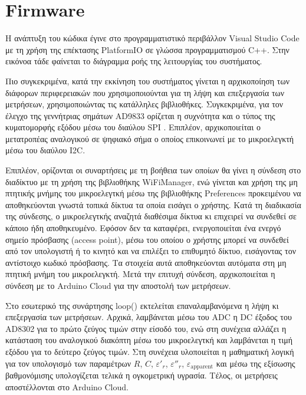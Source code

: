 \section{Firmware}
Η ανάπτυξη του κώδικα έγινε στο προγραμματιστικό περιβάλλον Visual Studio Code με τη χρήση της επέκτασης PlatformIO σε γλώσσα προγραμματισμού C++. Στην εικόνοα τάδε φαίνεται το διάγραμμα ροής της λειτουργίας του συστήματος.

\par Πιο συγκεκριμένα, κατά την εκκίνηση του συστήματος γίνεται η αρχικοποίηση των διάφορων περιφερειακών που χρησιμοποιούνται για τη λήψη και επεξεργασία των μετρήσεων, χρησιμοποιώντας τις κατάλληλες βιβλιοθήκες. Συγκεκριμένα, για τον έλεγχο της γεννήτριας σημάτων AD9833 ορίζεται η συχνότητα και ο τύπος της κυματομορφής εξόδου μέσω του διαύλου SPI . Επιπλέον, αρχικοποιείται ο μετατροπέας αναλογικού σε ψηφιακό σήμα ο οποίος επικοινωνεί με το μικροελεγκτή μέσω του διαύλου I2C.

\par Επιπλέον, ορίζονται οι συναρτήσεις με τη βοήθεια των οποίων θα γίνει η σύνδεση στο διαδίκτυο με τη χρήση της βιβλιοθήκης WiFiManager, ενώ γίνεται και χρήση της μη πτητικής μνήμης του μικροελεγτκή μέσω της βιβλιοθήκης Preferences προκειμένου να αποθηκεύονται γνωστά τοπικά δίκτυα τα οποία εισάγει ο χρήστης. Κατά τη διαδικασία της σύνδεσης, ο μικροελεγτκής αναζητά διαθέσιμα δίκτυα κι επιχειρεί να συνδεθεί σε κάποιο ήδη αποθηκευμένο. Εφόσον δεν τα καταφέρει, ενεργοποιείται ένα ενεργό σημείο πρόσβασης (access point), μέσω του οποίου ο χρήστης μπορεί να συνδεθεί από τον υπολογιστή ή το κινητό και να επιλέξει το επιθυμητό δίκτυο, εισάγοντας τον αντίστοιχο κωδικό πρόσβασης. Τα στοιχεία αυτά αποθηκεύονται αυτόματα στη μη πτητική μνήμη του μικροελεγκτή. Μετά την επιτυχή σύνδεση, αρχικοποιείται η σύνδεση με το Arduino Cloud για την αποστολή των μετρήσεων.

\par Στο εσωτερικό της συνάρτησης loop() εκτελείται επαναλαμβανόμενα η λήψη κι επεξεργασία των μετρήσεων. Αρχικά, λαμβάνεται μέσω του ADC η DC έξοδος του AD8302 για το πρώτο ζεύγος τιμών στην είσοδό του, ενώ στη συνέχεια αλλάζει η κατάσταση του αναλογικού διακόπτη  μέσω του μικροελεγτκή και λαμβάνεται η τιμή εξόδου για το δεύτερο ζεύγος τιμών. Στη συνέχεια υλοποιείται η μαθηματική λογική για τον υπολογισμό των παραμέτρων $R$, $C$, $\varepsilon'_r$, $\varepsilon''_r$, $\varepsilon_{\mathrm{apparent}}$ και μέσω της εξίσωσης βαθμονόμισης υπολογίζεται τελικά η ογκομετρική υγρασία. Τέλος, οι μετρήσεις αποστέλλονται στο Arduino Cloud.


